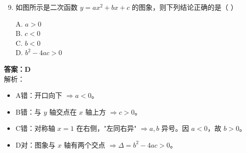\documentclass[12pt, a4paper]{article}
\begin{document}
\begin{examplebox}
    \begin{enumerate}[label=\textbf{例\arabic*.}]
        \setcounter{enumi}{8}
        \item 如图所示是二次函数 $y = ax^2 + bx + c$ 的图象，则下列结论正确的是（ \quad ）
        
        \begin{minipage}{0.3\textwidth}
        \end{minipage}
        \begin{minipage}{0.65\textwidth}
            A. $a > 0$ \\
            B. $c < 0$ \\
            C. $b < 0$ \\
            D. $b^2 - 4ac > 0$
        \end{minipage}
    \end{enumerate}
\end{examplebox}

\begin{answerbox}
    \textbf{答案：D} \\
    解析：
    \begin{itemize}
        \item A错：开口向下 $\Rightarrow a < 0$。
        \item B错：与 $y$ 轴交点在 $x$ 轴上方 $\Rightarrow c > 0$。
        \item C错：对称轴 $x=1$ 在右侧，"左同右异" $\Rightarrow a,b$ 异号。因 $a<0$，故 $b>0$。
        \item D对：图象与 $x$ 轴有两个交点 $\Rightarrow \Delta = b^2 - 4ac > 0$。
    \end{itemize}
\end{answerbox}
\end{document}
